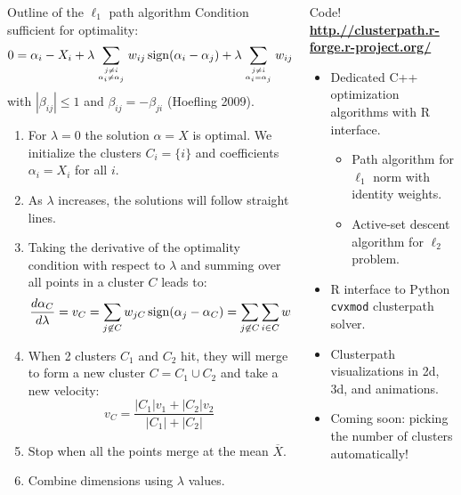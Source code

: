 \documentclass[final]{beamer}
\begin{document}
\begin{frame}{}
\begin{columns}[T]
\begin{column}{0.315\linewidth}
\begin{block}{Outline of the $\ell_1$ path algorithm}
Condition sufficient for optimality:
$$0 = \alpha_i - X_i + 
\lambda \sum_{j\neq i\atop \alpha_i \neq \alpha_j}w_{ij}
\operatorname{sign}({\alpha_i-\alpha_j}) + 
\lambda \sum_{j\neq i \atop \alpha_i = \alpha_j}w_{ij} \beta_{ij},$$
with $|\beta_{ij}|\leq 1$ and $\beta_{ij}=-\beta_{ji}$ (Hoefling 2009).
\begin{enumerate}
\item For $\lambda=0$ the solution $\alpha=X$ is optimal. We
  initialize the clusters $C_i = \{i\}$ and coefficients $\alpha_i =
  X_i$ for all $i$.
\item As $\lambda$ increases, the solutions will follow straight
  lines.
\item Taking the derivative of the optimality condition with respect
  to $\lambda$ and summing over all points in a cluster $C$ leads to:
$$\frac {d\alpha_C}{d\lambda}=v_C = \sum_{j\not\in C}w_{jC}\operatorname{sign}(\alpha_j-\alpha_C)=\sum_{j\not\in C}\sum_{i\in C} w_{ij}\operatorname{sign}(\alpha_j-\alpha_C)$$
\item When 2 clusters $C_1$ and $C_2$ hit, they will merge to form a
  new cluster $C = C_1\cup C_2$ and take a new velocity:
$$v_C = \frac{
|C_1|v_1 + |C_2|v_2
}{
|C_1|+|C_2|
}$$
\item Stop when all the points merge at the mean $\overline X$.
\item Combine dimensions using $\lambda$ values.
\end{enumerate}

\end{block}




\end{column}\hfill
\begin{column}{0.315\linewidth}
\begin{alertblock}{Code!
    \textbf{\url{http.//clusterpath.r-forge.r-project.org/}}}
\begin{itemize}
\item Dedicated C++ optimization algorithms with R interface.
  \begin{itemize}
  \item Path algorithm for $\ell_1$ norm with identity weights.
  \item Active-set descent algorithm for $\ell_2$ problem.
  \end{itemize}
\item R interface to Python \texttt{cvxmod} clusterpath solver.
\item Clusterpath visualizations in 2d, 3d, and animations.
\item Coming soon: picking the number of clusters automatically!
\end{itemize}
\end{alertblock}




\end{column}
\end{columns}
\end{frame}
\end{document}
